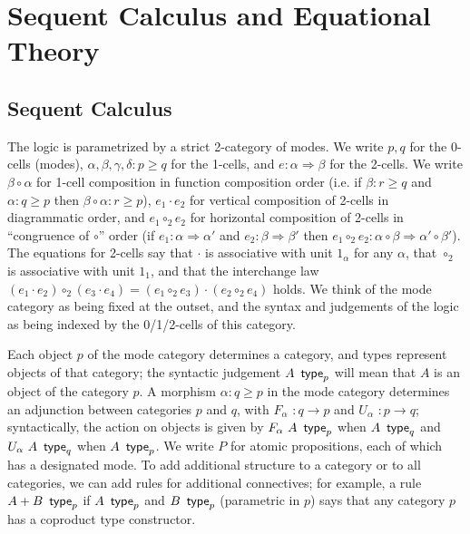 \documentclass{drl-common/llncs}
\newcommand{\tc}[2]{\ensuremath{#1 \Rightarrow #2}}
\newcommand\compo[2]{\ensuremath{#1 \circ #2}}
\newcommand\compv[2]{\ensuremath{#1 \cdot #2}}
\newcommand\comph[2]{\ensuremath{#1 \mathbin{\circ_2} #2}}
\renewcommand\wftp[2]{\ensuremath{#1 \,\,\, \dsd{type}_{#2}}}
\newcommand\F[2]{\ensuremath{F_{#1} \,\, #2}}
\newcommand\U[2]{\ensuremath{U_{#1} \,\, #2}}
\newcommand\coprd[2]{\ensuremath{#1 + #2}}
\begin{document}
\section{Sequent Calculus and Equational Theory}
\label{sec:rules}

\subsection{Sequent Calculus}

The logic is parametrized by a strict 2-category of modes.  We write
$p,q$ for the 0-cells (modes), $\alpha,\beta,\gamma,\delta : p \ge q$
for the 1-cells, and $e : \tc \alpha \beta$ for the 2-cells.  We write
\compo{\beta}{\alpha} for 1-cell composition in function composition
order (i.e. if $\beta : r \ge q$ and $\alpha : q \ge p$ then
$\compo{\beta}{\alpha} : r \ge p$), \compv{e_1}{e_2} for vertical
composition of 2-cells in diagrammatic order, and \comph{e_1}{e_2} for
horizontal composition of 2-cells in ``congruence of \compo{}{}'' order
(if $e_1 : \tc \alpha {\alpha'}$ and $e_2 : \tc \beta \beta'$ then
$\comph{e_1}{e_2} :
\tc{\compo{\alpha}{\beta}}{\compo{\alpha'}{\beta'}}$).  The equations
for 2-cells say that \compv{}{} is associative with unit $1_\alpha$ for
any $\alpha$, that \comph{}{} is associative with unit $1_1$, and that
the interchange law $\comph{(\compv{e_1}{e_2})}{(\compv{e_3}{e_4})} =
\compv{(\comph{e_1}{e_3})}{(\comph{e_2}{e_4})}$ holds.  We think of the
mode category as being fixed at the outset, and the syntax and
judgements of the logic as being indexed by the 0/1/2-cells of this
category.

Each object $p$ of the mode category determines a category, and types
represent objects of that category; the syntactic judgement \wftp{A}{p}
will mean that $A$ is an object of the category $p$.  A morphism $\alpha
: q \ge p$ in the mode category determines an adjunction between
categories $p$ and $q$, with $\F \alpha {} : q \to p$ and $\U \alpha {}
: p \to q$; syntactically, the action on objects is given by $\wftp{\F
  \alpha A}{p}$ when $\wftp{A}{q}$ and $\wftp{\U \alpha A}{q}$ when
$\wftp{A}{p}$.  We write $P$ for atomic propositions, each of which has
a designated mode.  To add additional structure to a category or to all
categories, we can add rules for additional connectives; for example, a
rule \wftp{\coprd{A}{B}}{p} if \wftp{A}{p} and \wftp{B}{p} (parametric
in $p$) says that any category $p$ has a coproduct type constructor.
\end{document}
